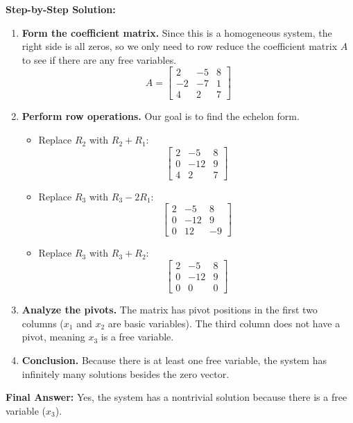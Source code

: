 \documentclass[11pt]{article}
\begin{document}
\textbf{Step-by-Step Solution:}
\begin{enumerate}
    \item \textbf{Form the coefficient matrix.} Since this is a homogeneous system, the right side is all zeros, so we only need to row reduce the coefficient matrix $A$ to see if there are any free variables.
    \[
    A = \begin{bmatrix}
    2 & -5 & 8 \\
    -2 & -7 & 1 \\
    4 & 2 & 7
    \end{bmatrix}
    \]
    \item \textbf{Perform row operations.} Our goal is to find the echelon form.
    \begin{itemize}
        \item Replace $R_2$ with $R_2 + R_1$:
        \[
        \begin{bmatrix}
        2 & -5 & 8 \\
        0 & -12 & 9 \\
        4 & 2 & 7
        \end{bmatrix}
        \]
        \item Replace $R_3$ with $R_3 - 2R_1$:
        \[
        \begin{bmatrix}
        2 & -5 & 8 \\
        0 & -12 & 9 \\
        0 & 12 & -9
        \end{bmatrix}
        \]
        \item Replace $R_3$ with $R_3 + R_2$:
        \[
        \begin{bmatrix}
        2 & -5 & 8 \\
        0 & -12 & 9 \\
        0 & 0 & 0
        \end{bmatrix}
        \]
    \end{itemize}
    \item \textbf{Analyze the pivots.} The matrix has pivot positions in the first two columns ($x_1$ and $x_2$ are basic variables). The third column does not have a pivot, meaning $x_3$ is a free variable.
    \item \textbf{Conclusion.} Because there is at least one free variable, the system has infinitely many solutions besides the zero vector.
\end{enumerate}
\textbf{Final Answer:} Yes, the system has a nontrivial solution because there is a free variable ($x_3$).
\end{document}
